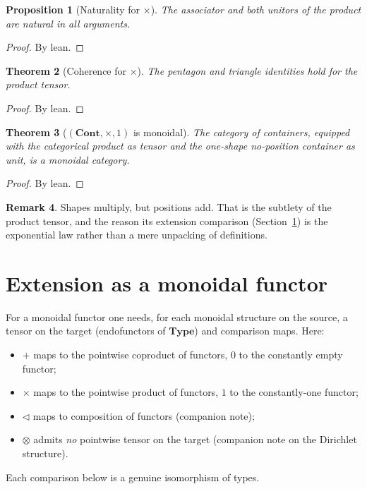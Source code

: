 \documentclass[11pt,a4paper]{article}
\theoremstyle{plain}
\newtheorem{theorem}{Theorem}[section]
\newtheorem{proposition}[theorem]{Proposition}
\theoremstyle{definition}
\newtheorem{remark}[theorem]{Remark}
\newcommand{\Type}{\mathbf{Type}}
\newcommand{\Cont}{\mathbf{Cont}}
\newcommand{\seq}{\mathbin{\triangleleft}}
\begin{document}
\begin{proposition}[Naturality for $\times$]\label{prop:prod-nat}
The associator and both unitors of the product are natural in all
arguments.
\end{proposition}

\begin{proof}
By lean.
\end{proof}

\begin{theorem}[Coherence for $\times$]\label{thm:prod-coherence}
The pentagon and triangle identities hold for the product tensor.
\end{theorem}

\begin{proof}
By lean.
\end{proof}

\begin{theorem}[$(\Cont, \times, 1)$ is monoidal]\label{thm:prod-monoidal}
The category of containers, equipped with the categorical product as
tensor and the one-shape no-position container as unit, is a monoidal
category.
\end{theorem}

\begin{proof}
By lean.
\end{proof}

\begin{remark}
Shapes multiply, but positions add. That is the subtlety of the product
tensor, and the reason its extension comparison (Section~\ref{sec:ext})
is the exponential law rather than a mere unpacking of definitions.
\end{remark}

\section{Extension as a monoidal functor}
\label{sec:ext}

For a monoidal functor one needs, for each monoidal structure on the
source, a tensor on the target (endofunctors of $\Type$) and comparison
maps. Here:
\begin{itemize}
  \item $+$ maps to the pointwise coproduct of functors, $0$ to the
        constantly empty functor;
  \item $\times$ maps to the pointwise product of functors, $1$ to the
        constantly-one functor;
  \item $\seq$ maps to composition of functors (companion note);
  \item $\otimes$ admits \emph{no} pointwise tensor on the target
        (companion note on the Dirichlet structure).
\end{itemize}
Each comparison below is a genuine isomorphism of types.
\end{document}
